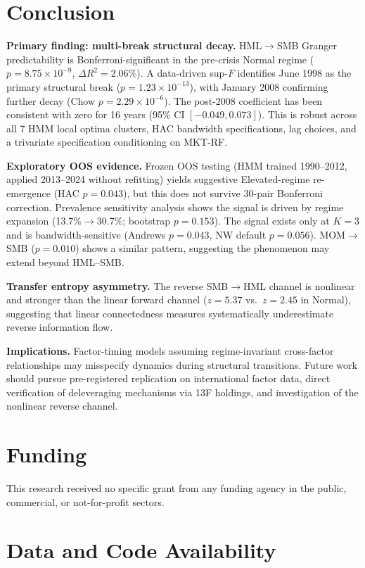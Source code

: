 \documentclass[sigconf,anonymous]{acmart}
\begin{document}
\section{Conclusion}

\textbf{Primary finding: multi-break structural decay.}
HML$\to$SMB Granger predictability is Bonferroni-significant in the
pre-crisis Normal regime ($p = 8.75 \times 10^{-9}$, $\Delta R^2 = 2.06\%$).
A data-driven sup-$F$ identifies June 1998 as the primary structural break
($p = 1.23\times10^{-13}$), with January 2008 confirming further decay
(Chow $p = 2.29\times10^{-6}$). The post-2008 coefficient has been
consistent with zero for 16 years (95\% CI $[-0.049, 0.073]$).
This is robust across all 7 HMM local optima clusters, HAC bandwidth
specifications, lag choices, and a trivariate specification conditioning on MKT-RF.

\textbf{Exploratory OOS evidence.}
Frozen OOS testing (HMM trained 1990--2012, applied 2013--2024 without refitting)
yields suggestive Elevated-regime re-emergence (HAC $p = 0.043$), but this
does not survive 30-pair Bonferroni correction. Prevalence sensitivity analysis
shows the signal is driven by regime expansion
(13.7\%$\to$30.7\%; bootstrap $p = 0.153$). The signal exists only at $K{=}3$
and is bandwidth-sensitive (Andrews $p = 0.043$, NW default $p = 0.056$).
MOM$\to$SMB ($p = 0.010$) shows a similar pattern, suggesting the phenomenon
may extend beyond HML--SMB.

\textbf{Transfer entropy asymmetry.}
The reverse SMB$\to$HML channel is nonlinear and stronger than the
linear forward channel ($z = 5.37$ vs.\ $z = 2.45$ in Normal), suggesting
that linear connectedness measures systematically underestimate reverse
information flow.

\textbf{Implications.} Factor-timing models assuming regime-invariant cross-factor
relationships may misspecify dynamics during structural transitions. Future work should
pursue pre-registered replication on international factor data, direct verification
of deleveraging mechanisms via 13F holdings, and investigation of the nonlinear
reverse channel.

\section*{Funding}

This research received no specific grant from any funding agency in the public,
commercial, or not-for-profit sectors.

\section*{Data and Code Availability}
\end{document}
